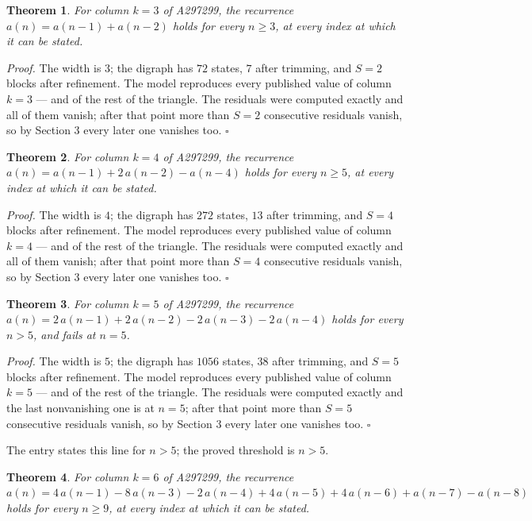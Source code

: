 \documentclass[11pt]{article}
\newtheorem{theorem}{Theorem}
\theoremstyle{definition}
\begin{document}
\begin{theorem} For column $k = 3$ of A297299, the recurrence $a(n) = a(n-1) + a(n-2)$ holds for every $n \ge 3$, at every index at which it can be stated.\end{theorem}

{\itshape Proof.} The width is $3$; the digraph has $72$ states, $7$ after trimming, and $S = 2$ blocks after refinement. The model reproduces every published value of column $k = 3$ --- and of the rest of the triangle. The residuals were computed exactly and all of them vanish; after that point more than $S = 2$ consecutive residuals vanish, so by Section 3 every later one vanishes too. $\square$

\begin{theorem} For column $k = 4$ of A297299, the recurrence $a(n) = a(n-1) + 2\,a(n-2) - a(n-4)$ holds for every $n \ge 5$, at every index at which it can be stated.\end{theorem}

{\itshape Proof.} The width is $4$; the digraph has $272$ states, $13$ after trimming, and $S = 4$ blocks after refinement. The model reproduces every published value of column $k = 4$ --- and of the rest of the triangle. The residuals were computed exactly and all of them vanish; after that point more than $S = 4$ consecutive residuals vanish, so by Section 3 every later one vanishes too. $\square$

\begin{theorem} For column $k = 5$ of A297299, the recurrence $a(n) = 2\,a(n-1) + 2\,a(n-2) - 2\,a(n-3) - 2\,a(n-4)$ holds for every $n > 5$, and fails at $n = 5$.\end{theorem}

{\itshape Proof.} The width is $5$; the digraph has $1056$ states, $38$ after trimming, and $S = 5$ blocks after refinement. The model reproduces every published value of column $k = 5$ --- and of the rest of the triangle. The residuals were computed exactly and the last nonvanishing one is at $n = 5$; after that point more than $S = 5$ consecutive residuals vanish, so by Section 3 every later one vanishes too. $\square$

The entry states this line for $n > 5$; the proved threshold is $n > 5$.

\begin{theorem} For column $k = 6$ of A297299, the recurrence $a(n) = 4\,a(n-1) - 8\,a(n-3) - 2\,a(n-4) + 4\,a(n-5) + 4\,a(n-6) + a(n-7) - a(n-8)$ holds for every $n \ge 9$, at every index at which it can be stated.\end{theorem}
\end{document}
